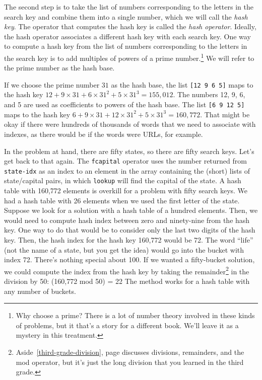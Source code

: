 The second step is to take the list of numbers corresponding
to the letters in the search key
and combine them into a single number, which we will call 
the \emph{hash key}.
The operator that computes the hash key is called
the \emph{hash operator}.
Ideally, the hash operator associates a different hash key
with each search key. 
One way to compute a hash key from the list of numbers
corresponding to the letters in the search key is
to add multiples of powers of a 
prime number.\footnote{Why choose a prime?
There is a lot of number theory involved in these kinds
of problems, but it that's a story for a different book.
We'll leave it as a mystery in this treatment.}
We will refer to the prime number as the 
hash base.

If we choose the prime number $31$
as the hash base, the list \texttt{[12 9 6 5]} maps to the hash key
$12 + 9\times31 + 6\times31^2 + 5\times31^3 = 155,012$. 
The numbers 12, 9, 6, and 5 are used as coefficients to powers of
the hash base.
The list \texttt{[6 9 12 5]} maps to the hash key
$6 + 9\times31 + 12\times31^2 + 5\times31^3 = 160,772$.
That might be okay if there were hundreds of thousands of words
that we need to associate with indexes, as there would be
if the words were URLs, for example.

In the problem at hand, there are fifty states, 
so there are fifty search keys.
Let's get back to that again.
The \texttt{fcapital} operator uses the
number returned from \texttt{state-idx} as an index to
an element in the array containing the (short) lists of
state/capital pairs, in which
\texttt{lookup} will find the capital of the state.
A hash table with 160,772 elements is overkill for
a problem with fifty search keys.
We had a hash table with 26 elements when we used the first letter of the state. 
Suppose we look for a solution with a hash table of a hundred elements. 
Then, we would need to compute hash index between zero and ninety-nine
from the hash key. One way to do that would be to
consider only the last two digits of the hash key.
Then, the hash index for the hash key 160,772 would be 72.
The word ``life'' (not the name of a state, but you get the idea) 
would go into the bucket
with index 72.
There's nothing special about 100. 
If we wanted a fifty-bucket solution,
we could compute the index from the hash key by taking the 
remainder\footnote{Aside~\ref{third-grade-division},
page \pageref{third-grade-division} discusses
divisions, remainders, and the mod operator,
but it's just the long division that you learned in the third grade.}
in the division by 50: (160,772 mod 50) = 22
The method works for a hash table with any number of buckets.

